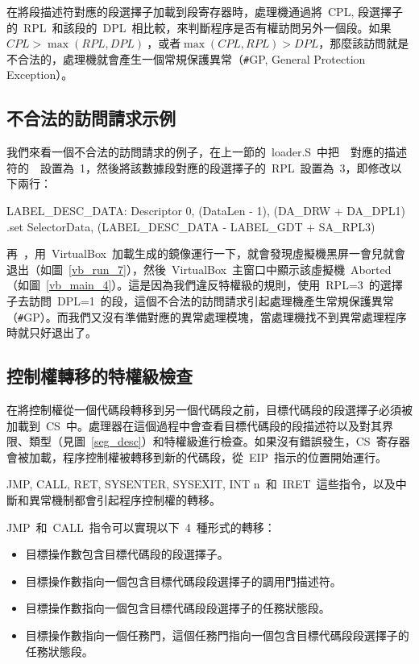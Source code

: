 在將段描述符對應的段選擇子加載到段寄存器時，處理機通過將~CPL, 段選擇子的~RPL~和該段的~DPL~相比較，來判斷程序是否有權訪問另外一個段。如果~$CPL>\max{(RPL, DPL)}~$，或者$\max{(CPL, RPL)}>DPL$，那麼該訪問就是不合法的，處理機就會產生一個常規保護異常（\texttt{\#}GP, General Protection Exception）。

\subsection{不合法的訪問請求示例}

我們來看一個不合法的訪問請求的例子，在上一節的~loader.S~中把~~對應的描述符的~~設置為~1，然後將該數據段對應的段選擇子的~RPL~設置為~3，即修改以下兩行：
\begin{Command}
LABEL_DESC_DATA:    Descriptor        0,      (DataLen - 1), (DA_DRW + DA_DPL1)
.set    SelectorData,   (LABEL_DESC_DATA   - LABEL_GDT + SA_RPL3)
\end{Command}



再~，用~VirtualBox~加載生成的鏡像運行一下，就會發現虛擬機黑屏一會兒就會退出（如圖~\ref{vb_run_7}），然後~VirtualBox~主窗口中顯示該虛擬機~Aborted（如圖~\ref{vb_main_4}）。這是因為我們違反特權級的規則，使用~RPL=3~的選擇子去訪問~DPL=1~的段，這個不合法的訪問請求引起處理機產生常規保護異常（\texttt{\#}GP）。而我們又沒有準備對應的異常處理模塊，當處理機找不到異常處理程序時就只好退出了。


\subsection{控制權轉移的特權級檢查}

在將控制權從一個代碼段轉移到另一個代碼段之前，目標代碼段的段選擇子必須被加載到~CS~中。處理器在這個過程中會查看目標代碼段的段描述符以及對其界限、類型（見圖~\ref{seg_desc}）和特權級進行檢查。如果沒有錯誤發生，CS~寄存器會被加載，程序控制權被轉移到新的代碼段，從~EIP~指示的位置開始運行。

JMP, CALL, RET, SYSENTER, SYSEXIT, INT n~和~IRET~這些指令，以及中斷和異常機制都會引起程序控制權的轉移。

JMP~和~CALL~指令可以實現以下~4~種形式的轉移：

\begin{itemize}
\item 目標操作數包含目標代碼段的段選擇子。
\item 目標操作數指向一個包含目標代碼段段選擇子的調用門描述符。
\item 目標操作數指向一個包含目標代碼段段選擇子的任務狀態段。
\item 目標操作數指向一個任務門，這個任務門指向一個包含目標代碼段段選擇子的任務狀態段。
\end{itemize}

